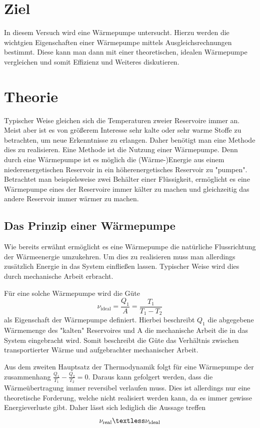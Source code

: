 \section{Ziel}
\label{sec:Ziel}
In diesem Versuch wird eine Wärmepumpe untersucht. Hierzu werden die wichtgien Eigenschaften einer Wärmepumpe mittels Ausgleichsrechnungen bestimmt. Diese kann man dann mit einer 
theoretischen, idealen Wärmepumpe vergleichen und somit Effizienz und Weiteres diskutieren.
\section{Theorie}
\label{sec:Theorie}
Typischer Weise gleichen sich die Temperaturen zweier Reservoire immer an. Meist aber ist es von größerem Interesse sehr kalte oder sehr warme Stoffe zu betrachten, um neue Erkenntnisse
zu erlangen. Daher benötigt man eine Methode dies zu realisieren. Eine Methode ist die Nutzung einer Wärmepumpe. Denn durch eine Wärmepumpe ist es möglich die (Wärme-)Energie aus 
einem niederenergetischen Reservoir in ein höherenergetisches Reservoir zu "pumpen". Betrachtet man beispielsweise zwei Behälter einer Flüssigkeit, ermöglicht es eine Wärmepumpe 
eines der Reservoire immer kälter zu machen und gleichzeitig das andere Reservoir immer wärmer zu machen.
\subsection{Das Prinzip einer Wärmepumpe}
\label{subsec:Prinzip}
Wie bereits erwähnt ermöglicht es eine Wärmepumpe die natürliche Flussrichtung der Wärmeenergie umzukehren. Um dies zu realisieren muss man allerdings zusätzlich Energie in das System
einfließen lassen. Typischer Weise wird dies durch mechanische Arbeit erbracht.


Für eine solche Wärmepumpe wird die Güte
\begin{equation}
    \label{eqn:Güte_ideal}
    \nu_{\text{ideal}} = \frac{Q_1}{A} = \frac{T_1}{T_1 - T_2}
\end{equation}
als Eigenschaft der Wärmepumpe definiert. Hierbei beschreibt $Q_1$ die abgegebene Wärmemenge des "kalten"\: Reservoires und A die mechanische Arbeit die in das System eingebracht wird.
Somit beschreibt die Güte das Verhältnis zwischen transportierter Wärme und aufgebrachter mechanischer Arbeit. 


Aus dem zweiten Hauptsatz der Thermodynamik folgt für eine Wärmepumpe der zusammenhang $\frac{Q_1}{T_1} - \frac{Q_2}{T_2} = 0$. Daraus kann gefolgert werden, dass die Wärmeübertragung 
immer reversibel verlaufen muss. Dies ist allerdings nur eine theoretische Forderung, welche nicht realisiert werden kann, da es immer gewisse Energieverluste gibt. Daher lässt sich
lediglich die Aussage treffen 
\begin{equation*}
    \label{eqn:Güte_real}
    \nu_{\text{real}} \textless \nu_{\text{ideal}}
\end{equation*}

